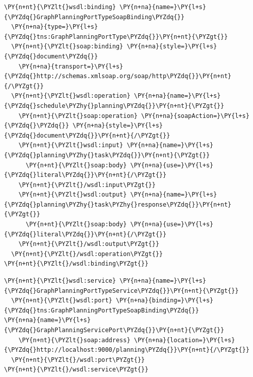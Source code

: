 \begin{program}
\begin{code}
\begin{Verbatim}[commandchars=\\\{\}]
\PY{n+nt}{\PYZlt{}wsdl:binding} \PY{n+na}{name=}\PY{l+s}{\PYZdq{}GraphPlanningPortTypeSoapBinding\PYZdq{}} 
  \PY{n+na}{type=}\PY{l+s}{\PYZdq{}tns:GraphPlanningPortType\PYZdq{}}\PY{n+nt}{\PYZgt{}}
  \PY{n+nt}{\PYZlt{}soap:binding} \PY{n+na}{style=}\PY{l+s}{\PYZdq{}document\PYZdq{}} 
    \PY{n+na}{transport=}\PY{l+s}{\PYZdq{}http://schemas.xmlsoap.org/soap/http\PYZdq{}}\PY{n+nt}{/\PYZgt{}}
  \PY{n+nt}{\PYZlt{}wsdl:operation} \PY{n+na}{name=}\PY{l+s}{\PYZdq{}schedule\PYZhy{}planning\PYZdq{}}\PY{n+nt}{\PYZgt{}}
    \PY{n+nt}{\PYZlt{}soap:operation} \PY{n+na}{soapAction=}\PY{l+s}{\PYZdq{}\PYZdq{}} \PY{n+na}{style=}\PY{l+s}{\PYZdq{}document\PYZdq{}}\PY{n+nt}{/\PYZgt{}}
    \PY{n+nt}{\PYZlt{}wsdl:input} \PY{n+na}{name=}\PY{l+s}{\PYZdq{}planning\PYZhy{}task\PYZdq{}}\PY{n+nt}{\PYZgt{}}
      \PY{n+nt}{\PYZlt{}soap:body} \PY{n+na}{use=}\PY{l+s}{\PYZdq{}literal\PYZdq{}}\PY{n+nt}{/\PYZgt{}}
    \PY{n+nt}{\PYZlt{}/wsdl:input\PYZgt{}}
    \PY{n+nt}{\PYZlt{}wsdl:output} \PY{n+na}{name=}\PY{l+s}{\PYZdq{}planning\PYZhy{}task\PYZhy{}response\PYZdq{}}\PY{n+nt}{\PYZgt{}}
      \PY{n+nt}{\PYZlt{}soap:body} \PY{n+na}{use=}\PY{l+s}{\PYZdq{}literal\PYZdq{}}\PY{n+nt}{/\PYZgt{}}
    \PY{n+nt}{\PYZlt{}/wsdl:output\PYZgt{}}
  \PY{n+nt}{\PYZlt{}/wsdl:operation\PYZgt{}}
\PY{n+nt}{\PYZlt{}/wsdl:binding\PYZgt{}}
\end{Verbatim}
\end{code}
\end{program}



\begin{program}
\begin{code}
\begin{Verbatim}[commandchars=\\\{\}]
\PY{n+nt}{\PYZlt{}wsdl:service} \PY{n+na}{name=}\PY{l+s}{\PYZdq{}GraphPlanningPortTypeService\PYZdq{}}\PY{n+nt}{\PYZgt{}}
  \PY{n+nt}{\PYZlt{}wsdl:port} \PY{n+na}{binding=}\PY{l+s}{\PYZdq{}tns:GraphPlanningPortTypeSoapBinding\PYZdq{}}
\PY{n+na}{name=}\PY{l+s}{\PYZdq{}GraphPlanningServicePort\PYZdq{}}\PY{n+nt}{\PYZgt{}}
    \PY{n+nt}{\PYZlt{}soap:address} \PY{n+na}{location=}\PY{l+s}{\PYZdq{}http://localhost:9000/planning\PYZdq{}}\PY{n+nt}{/\PYZgt{}}
  \PY{n+nt}{\PYZlt{}/wsdl:port\PYZgt{}}
\PY{n+nt}{\PYZlt{}/wsdl:service\PYZgt{}}
\end{Verbatim}
\end{code}
\end{program}


